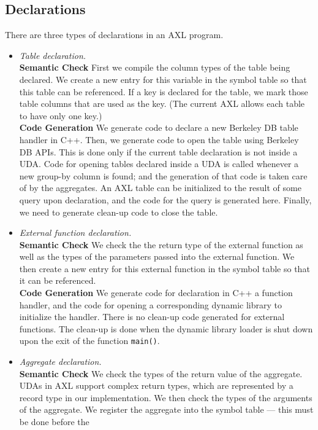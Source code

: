 \subsection{Declarations}
There are three types of declarations in an AXL program.
\begin{itemize}
\item {\it Table declaration.}  \\
  {\bf Semantic Check} First we compile the column types of the table
  being declared. We create a new entry for this variable in the
  symbol table so that this table can be referenced. If a key is
  declared for the table, we mark those table columns that are used as
  the key. (The current AXL allows each table to have only
  one key.) \\
  {\bf Code Generation} We generate code to declare a new Berkeley DB
  table handler in C++. Then, we generate code to open the table using
  Berkeley DB APIs. This is done only if the current table declaration
  is not inside a UDA. Code for opening tables declared inside a UDA
  is called whenever a new group-by column is found; and the
  generation of that code is taken care of by the aggregates. An AXL
  table can be initialized to the result of some query upon
  declaration, and the code for the query is generated here. Finally,
  we need to generate clean-up code to close the table.
\item {\it External function declaration.}\\
  {\bf Semantic Check} We check the the return type of the external
  function as well as the types of the parameters passed into the
  external function. We then create a new entry for this external
  function in the symbol table so that it can be referenced. \\
  {\bf Code Generation} We generate code for declaration in C++ a
  function handler, and the code for opening a corresponding dynamic
  library to initialize the handler.  There is no clean-up code
  generated for external functions. The clean-up is done when the
  dynamic library loader is shut down upon the exit of the function
  {\tt main()}.
\item {\it Aggregate declaration.}\\
  {\bf Semantic Check} We check the types of the return value of the
  aggregate. UDAs in AXL support complex return types, which are
  represented by a record type in our implementation. We then check
  the types of the arguments of the aggregate. We register the
  aggregate into the symbol table --- this must be done before the

\end{itemize}
